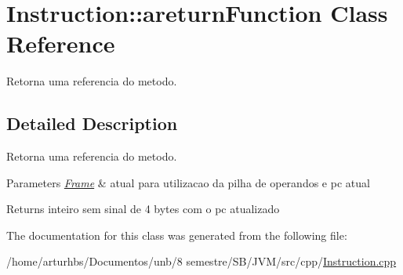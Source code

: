 \hypertarget{classInstruction_1_1areturnFunction}{}\section{Instruction\+:\+:areturn\+Function Class Reference}
\label{classInstruction_1_1areturnFunction}


Retorna uma referencia do metodo.  




\subsection{Detailed Description}
Retorna uma referencia do metodo. 


\begin{DoxyParams}{Parameters}
{\em \hyperlink{classFrame}{Frame}} & atual para utilizacao da pilha de operandos e pc atual \\
\hline
\end{DoxyParams}
\begin{DoxyReturn}{Returns}
inteiro sem sinal de 4 bytes com o pc atualizado 
\end{DoxyReturn}


The documentation for this class was generated from the following file\+:\begin{DoxyCompactItemize}
\item 
/home/arturhbs/\+Documentos/unb/8 semestre/\+S\+B/\+J\+V\+M/src/cpp/\hyperlink{Instruction_8cpp}{Instruction.\+cpp}\end{DoxyCompactItemize}
